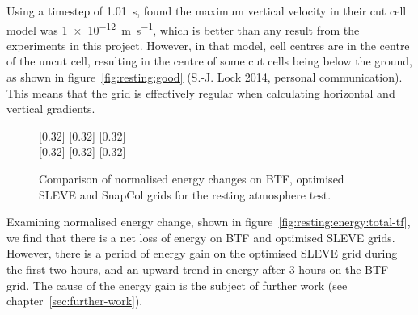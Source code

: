 Using a timestep of \SI{1.01}{\second}, \textcite{good2013} found the maximum vertical velocity in their cut cell model was \SI{1e-12}{\meter\per\second}, which is better than any result from the experiments in this project.  However, in that model, cell centres are in the centre of the uncut cell, resulting in the centre of some cut cells being below the ground, as shown in figure~\ref{fig:resting:good} (S.-J. Lock 2014, personal communication).  This means that the grid is effectively regular when calculating horizontal and vertical gradients.

\begin{figure}
	\captionsetup[subfigure]{position=b}
	\centering
	[0.32\textwidth]{}
	\hfill
	[0.32\textwidth]{}
	\hfill
	[0.32\textwidth]{}
	\\
	[0.32\textwidth]{}
	\hfill
	[0.32\textwidth]{}
	\hfill
	[0.32\textwidth]{}
	\caption{Comparison of normalised energy changes on BTF, optimised SLEVE and SnapCol grids for the resting atmosphere test.}
	\label{fig:resting:energy}
\end{figure}

Examining normalised energy change, shown in figure~\ref{fig:resting:energy:total-tf}, we find that there is a net loss of energy on BTF and optimised SLEVE grids.  However, there is a period of energy gain on the optimised SLEVE grid during the first two hours, and an upward trend in energy after 3 hours on the BTF grid.  The cause of the energy gain is the subject of further work (see chapter~\ref{sec:further-work}).

